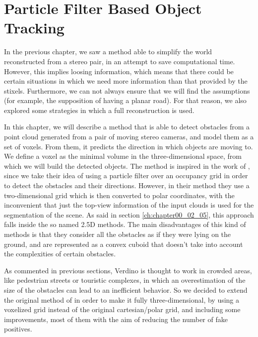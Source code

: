 
\graphicspath{{./images/chapter05/bmps/}{./images/chapter05/vects/}{./images/chapter05/}}

\chapter{Particle Filter Based Object Tracking}\label{ch:chapter05}

In the previous chapter, we saw a method able to simplify the world reconstructed from a stereo pair, in an attempt to save computational time. However, this implies loosing information, which means that there could be certain situations in which we need more information than that provided by the stixels. Furthermore, we can not always ensure that we will find the assumptions (for example, the supposition of having a planar road). For that reason, we also explored some strategies in which a full reconstruction is used.

In this chapter, we will describe a method that is able to detect obstacles from a point cloud generated from a pair of moving stereo cameras, and model them as a set of voxels. From them, it predicts the direction in which objects are moving to. We define a voxel as the minimal volume in the three-dimensional space, from which we will build the detected objects. The method is inspired in the work of \cite{danescu2012particle}, since we take their idea of using a particle filter over an occupancy grid in order to detect the obstacles and their directions. However, in their method they use a two-dimensional grid which is then converted to polar coordinates, with the inconvenient that just the top-view information of the input clouds is used for the segmentation of the scene. As said in section \ref{ch:chapter00_02_05}, this approach falls inside the so named 2.5D methods. The main disadvantages of this kind of methods is that they consider all the obstacles as if they were lying on the ground, and are represented as a convex cuboid that doesn't take into account the complexities of certain obstacles.

As commented in previous sections, Verdino is thought to work in crowded areas, like pedestrian streets or touristic complexes, in which an overestimation of the size of the obstacles can lead to an inefficient behavior. So we decided to extend the original method of \cite{danescu2012particle} in order to make it fully three-dimensional, by using a voxelized grid instead of the original cartesian/polar grid, and including some improvements, most of them with the aim of reducing the number of fake positives.

